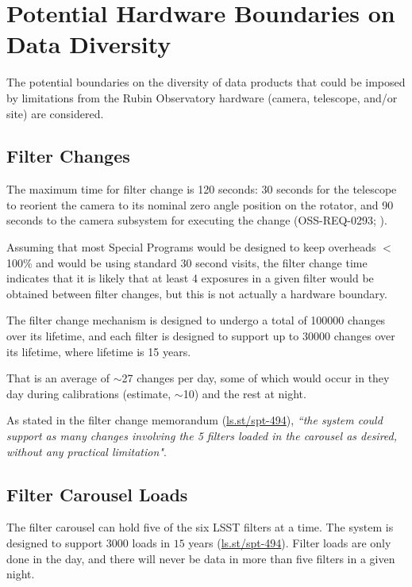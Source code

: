 \section{Potential Hardware Boundaries on Data Diversity}\label{sec:hardbounds}

The potential boundaries on the diversity of data products that could be imposed by 
limitations from the Rubin Observatory hardware (camera, telescope, and/or site) 
are considered.

\subsection{Filter Changes}

The maximum time for filter change is 120 seconds: 30 seconds for the telescope to 
reorient the camera to its nominal zero angle position on the rotator, and 90 seconds to 
the camera subsystem for executing the change (OSS-REQ-0293; ).

Assuming that most Special Programs would be designed to keep overheads $<$100\% and would 
be using standard 30 second visits, the filter change time indicates that it is likely 
that at least 4 exposures in a given filter would be obtained between filter changes, but 
this is not actually a hardware boundary.

The filter change mechanism is designed to undergo a total of 100000 changes over its 
lifetime, and each filter is designed to support up to 30000 changes over its lifetime, 
where lifetime is 15 years.

That is an average of $\sim$27 changes per day, some of which would occur in they day 
during calibrations (estimate, $\sim$10) and the rest at night.

As stated in the filter change memorandum (\url{ls.st/spt-494}), {\it ``the system could 
support as many changes involving the 5 filters loaded in the carousel as desired, without 
any practical limitation"}.

\subsection{Filter Carousel Loads}

The filter carousel can hold five of the six LSST filters at a time. 
The system is designed to support $3000$ loads in $15$ years (\url{ls.st/spt-494}). 
Filter loads are only done in the day, and there will never be data in more than five 
filters in a given night.


